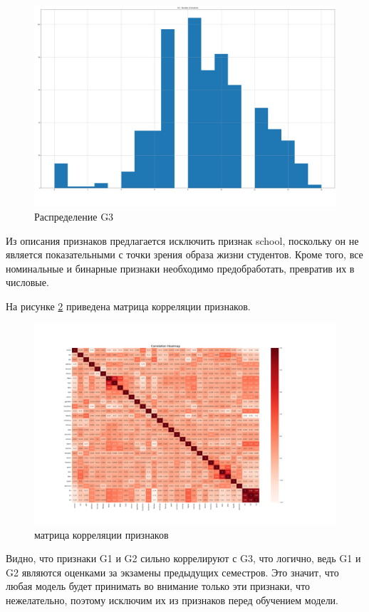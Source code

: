 \begin{figure}[h!]
	\centering
	\includegraphics[scale = 0.13]{img/G3_hist.png}
	\caption{Распределение G3}
	\label{fig:g3-hist}
\end{figure}


Из описания признаков предлагается исключить признак school, поскольку он не является показательными с точки зрения образа жизни студентов. Кроме того, все номинальные и бинарные признаки необходимо предобработать, превратив их в числовые.

На рисунке \ref{fig:corr-matrix} приведена матрица корреляции признаков.
\begin{figure}[h!]
	\centering
	\includegraphics[width = \linewidth]{img/correlation.png}
	\caption{матрица корреляции признаков}
	\label{fig:corr-matrix}
\end{figure}

Видно, что признаки G1 и G2 сильно коррелируют с G3, что логично, ведь G1 и G2 являются оценками за экзамены предыдущих семестров. Это значит, что любая модель будет принимать во внимание только эти признаки, что нежелательно, поэтому исключим их из признаков перед обучением модели.


